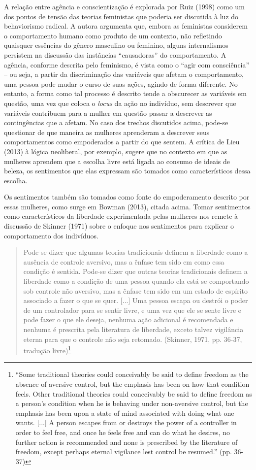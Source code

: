 A relação entre agência e conscientização é explorada por Ruiz (1998) como um dos pontos de tensão das teorias feministas que poderia ser discutida à luz do behaviorismo radical. A autora argumenta que, embora as feministas considerem o comportamento humano como produto de um contexto, não refletindo quaisquer essências do gênero masculino ou feminino, alguns internalismos persistem na discussão das instâncias “causadoras” do comportamento. A agência, conforme descrita pelo feminismo, é vista como o “agir com consciência” – ou seja, a partir da discriminação das variáveis que afetam o comportamento, uma pessoa pode mudar o curso de suas ações, agindo de forma diferente. No entanto, a forma como tal processo é descrito tende a obscurecer as variáveis em questão, uma vez que coloca o \textit{locus} da ação no indivíduo, sem descrever que variáveis contribuem para a mulher em questão passar a descrever as contingências que a afetam. No caso dos trechos discutidos acima, pode-se questionar de que maneira as mulheres aprenderam a descrever seus comportamentos como empoderados a partir do que sentem. A crítica de Lieu (2013) à lógica neoliberal, por exemplo, sugere que no contexto em que as mulheres aprendem que a escolha livre está ligada ao consumo de ideais de beleza, os sentimentos que elas expressam são tomados como característicos dessa escolha.

Os sentimentos também são tomados como fonte do empoderamento descrito por essas mulheres, como surge em Bowman (2013), citada acima. Tomar sentimentos como característicos da liberdade experimentada pelas mulheres nos remete à discussão de Skinner (1971) sobre o enfoque nos sentimentos para explicar o comportamento dos indivíduos.

\begin{quote}
    Pode-se dizer que algumas teorias tradicionais definem a liberdade como a ausência de controle aversivo, mas a ênfase tem sido em como essa condição é sentida. Pode-se dizer que outras teorias tradicionais definem a liberdade como a condição de uma pessoa quando ela está se comportando sob controle não aversivo, mas a ênfase tem sido em um estado de espírito associado a fazer o que se quer. [...] Uma pessoa escapa ou destrói o poder de um controlador para se sentir livre, e uma vez que ele se sente livre e pode fazer o que ele deseja, nenhuma ação adicional é recomendada e nenhuma é prescrita pela literatura de liberdade, exceto talvez vigilância eterna para que o controle não seja retomado. (Skinner, 1971, pp. 36-37, tradução livre)\footnote{“Some traditional theories could conceivably be said to define freedom as the absence of aversive control, but the emphasis has been on how that condition feels. Other traditional theories could conceivably be said to define freedom as a person's condition when he is behaving under non-aversive control, but the emphasis has been upon a state of mind associated with doing what one wants. [...] A person escapes from or destroys the power of a controller in order to feel free, and once he feels free and can do what he desires, no further action is recommended and none is prescribed by the literature of freedom, except perhaps eternal vigilance lest control be resumed.” (pp. 36-37)}
\end{quote}

